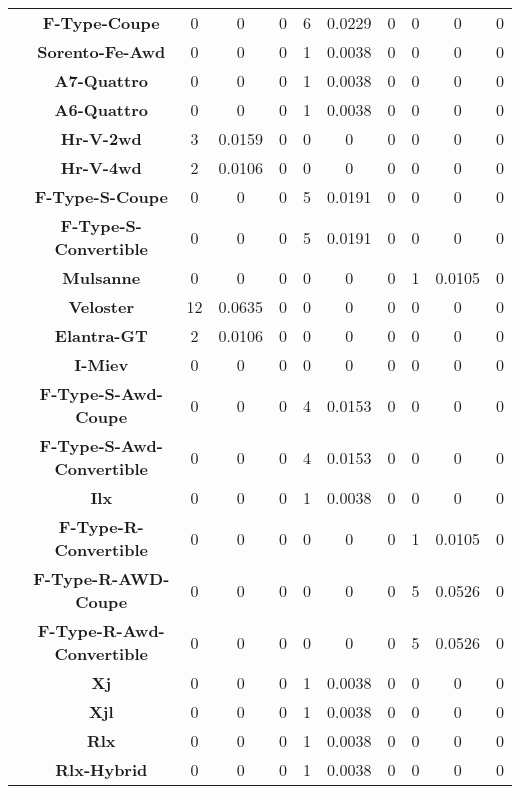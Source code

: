 \begin{center}
\begin{tabular}{|c|c||@{\hspace{1ex}}||c|c|c||@{\hspace{1ex}}||c|c|c||@{\hspace{1ex}}||c|c|c||@{\hspace{1ex}}||}
\cline{2-11}
  & {\bf F-Type-Coupe} & 0 & 0 & 0 & 6 & 0.0229 & 0 & 0 & 0 & 0 \\
\cline{2-11}
  & {\bf Sorento-Fe-Awd} & 0 & 0 & 0 & 1 & 0.0038 & 0 & 0 & 0 & 0 \\
\cline{2-11}
  & {\bf A7-Quattro} & 0 & 0 & 0 & 1 & 0.0038 & 0 & 0 & 0 & 0 \\
\cline{2-11}
  & {\bf A6-Quattro} & 0 & 0 & 0 & 1 & 0.0038 & 0 & 0 & 0 & 0 \\
\cline{2-11}
  & {\bf Hr-V-2wd} & 3 & 0.0159 & 0 & 0 & 0 & 0 & 0 & 0 & 0 \\
\cline{2-11}
  & {\bf Hr-V-4wd} & 2 & 0.0106 & 0 & 0 & 0 & 0 & 0 & 0 & 0 \\
\cline{2-11}
  & {\bf F-Type-S-Coupe} & 0 & 0 & 0 & 5 & 0.0191 & 0 & 0 & 0 & 0 \\
\cline{2-11}
  & {\bf F-Type-S-Convertible} & 0 & 0 & 0 & 5 & 0.0191 & 0 & 0 & 0 & 0 \\
\cline{2-11}
  & {\bf Mulsanne} & 0 & 0 & 0 & 0 & 0 & 0 & 1 & 0.0105 & 0 \\
\cline{2-11}
  & {\bf Veloster} & 12 & 0.0635 & 0 & 0 & 0 & 0 & 0 & 0 & 0 \\
\cline{2-11}
  & {\bf Elantra-GT} & 2 & 0.0106 & 0 & 0 & 0 & 0 & 0 & 0 & 0 \\
\cline{2-11}
  & {\bf I-Miev} & 0 & 0 & 0 & 0 & 0 & 0 & 0 & 0 & 0 \\
\cline{2-11}
  & {\bf F-Type-S-Awd-Coupe} & 0 & 0 & 0 & 4 & 0.0153 & 0 & 0 & 0 & 0 \\
\cline{2-11}
  & {\bf F-Type-S-Awd-Convertible} & 0 & 0 & 0 & 4 & 0.0153 & 0 & 0 & 0 & 0 \\
\cline{2-11}
  & {\bf Ilx} & 0 & 0 & 0 & 1 & 0.0038 & 0 & 0 & 0 & 0 \\
\cline{2-11}
  & {\bf F-Type-R-Convertible} & 0 & 0 & 0 & 0 & 0 & 0 & 1 & 0.0105 & 0 \\
\cline{2-11}
  & {\bf F-Type-R-AWD-Coupe} & 0 & 0 & 0 & 0 & 0 & 0 & 5 & 0.0526 & 0 \\
\cline{2-11}
  & {\bf F-Type-R-Awd-Convertible} & 0 & 0 & 0 & 0 & 0 & 0 & 5 & 0.0526 & 0 \\
\cline{2-11}
  & {\bf Xj} & 0 & 0 & 0 & 1 & 0.0038 & 0 & 0 & 0 & 0 \\
\cline{2-11}
  & {\bf Xjl} & 0 & 0 & 0 & 1 & 0.0038 & 0 & 0 & 0 & 0 \\
\cline{2-11}
  & {\bf Rlx} & 0 & 0 & 0 & 1 & 0.0038 & 0 & 0 & 0 & 0 \\
\cline{2-11}
  & {\bf Rlx-Hybrid} & 0 & 0 & 0 & 1 & 0.0038 & 0 & 0 & 0 & 0 \\

\end{tabular}
\end{center}
